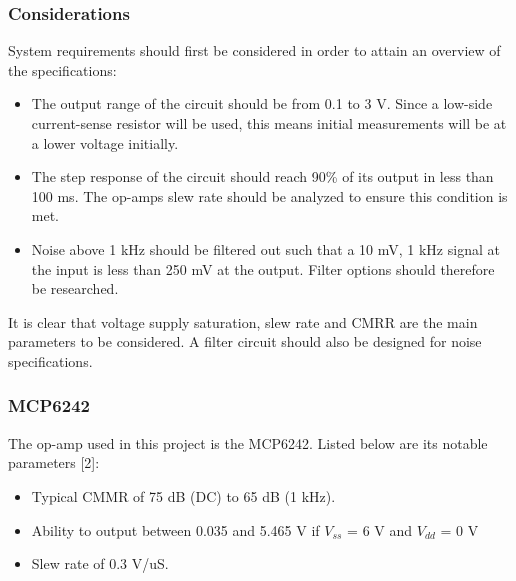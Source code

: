 \subsubsection{Considerations}\label{sec:opamps_considerations}
System requirements should first be considered in order to attain an overview of the specifications:
\begin{itemize}
    \item The output range of the circuit should be from 0.1 to 3 V. Since a low-side current-sense resistor will be used, this means initial measurements will be at a lower voltage initially.
    \item The step response of the circuit should reach 90\% of its output in less than 100 ms. The op-amps slew rate should be analyzed to ensure this condition is met.
    \item Noise above 1 kHz should be filtered out such that a 10 mV, 1 kHz signal at the input is less than 250 mV at the output. Filter options should therefore be researched.
\end{itemize}

It is clear that voltage supply saturation, slew rate and CMRR are the main parameters to be considered. A filter circuit should also be designed for noise specifications.

\subsubsection{MCP6242}\label{sec:opamps_MCP6242}
The op-amp used in this project is the MCP6242. Listed below are its notable parameters [2]:
\begin{itemize}
    \item Typical CMMR of 75 dB (DC) to 65 dB (1 kHz).
    \item Ability to output between 0.035 and 5.465 V if $V_{ss}$ = 6 V and $V_{dd}$ = 0 V
    \item Slew rate of 0.3 V/uS.
\end{itemize}

